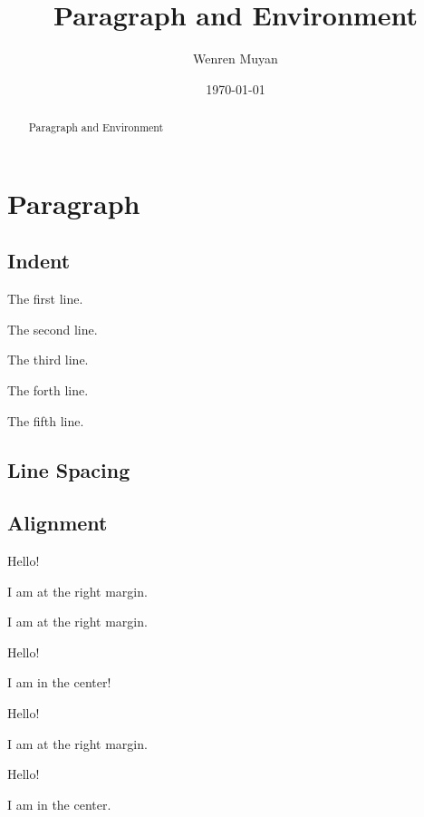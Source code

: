 \documentclass{article}
\title{Paragraph and Environment}
\author{Wenren Muyan}
\date{\today}
\begin{document}
    \maketitle

    \begin{abstract}
        Paragraph and Environment
    \end{abstract}

    \tableofcontents

    \section{Paragraph}
        \subsection{Indent}
            The first line. \par
            The second line. \par
            \noindent The third line. \par
            \indent The forth line. \par
            \indent\indent The fifth line. \par
        \subsection{Line Spacing}
        \subsection{Alignment} 
            {
                \raggedleft Hello!\par   %
                \raggedleft I am at the right margin. \par
                \raggedleft I am at the right margin. 
            }\par
            {
                \centering Hello!\par
                \centering I am in the center!
            }
            \begin{flushright}
                Hello!\par
                I am at the right margin. 
            \end{flushright}
            \begin{center}
                Hello!\par
                I am in the center. 
            \end{center}
\end{document}
